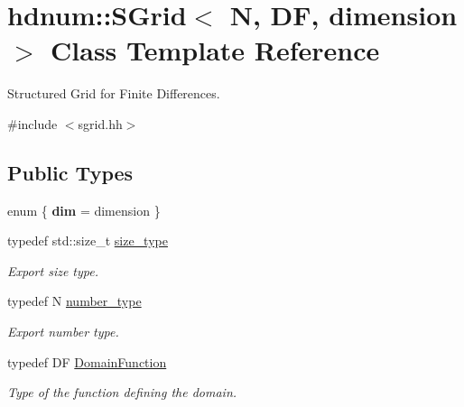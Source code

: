 \hypertarget{classhdnum_1_1SGrid}{
\section{hdnum::SGrid$<$ N, DF, dimension $>$ Class Template Reference}
\label{classhdnum_1_1SGrid}
}


Structured Grid for Finite Differences.  




{\ttfamily \#include $<$sgrid.hh$>$}

\subsection*{Public Types}
\begin{DoxyCompactItemize}
\item 
enum \{ {\bfseries dim} =  dimension
 \}
\item 
\hypertarget{classhdnum_1_1SGrid_aba7c973b280ecd56f211ac4b8d746280}{
typedef std::size\_\-t \hyperlink{classhdnum_1_1SGrid_aba7c973b280ecd56f211ac4b8d746280}{size\_\-type}}
\label{classhdnum_1_1SGrid_aba7c973b280ecd56f211ac4b8d746280}

\begin{DoxyCompactList}\small\item\em Export size type. \item\end{DoxyCompactList}\item 
\hypertarget{classhdnum_1_1SGrid_ab27de1dac2771512d96a858153db82f5}{
typedef N \hyperlink{classhdnum_1_1SGrid_ab27de1dac2771512d96a858153db82f5}{number\_\-type}}
\label{classhdnum_1_1SGrid_ab27de1dac2771512d96a858153db82f5}

\begin{DoxyCompactList}\small\item\em Export number type. \item\end{DoxyCompactList}\item 
\hypertarget{classhdnum_1_1SGrid_a0442a89c48bb466449cb1a7e5d4cc5f6}{
typedef DF \hyperlink{classhdnum_1_1SGrid_a0442a89c48bb466449cb1a7e5d4cc5f6}{DomainFunction}}
\label{classhdnum_1_1SGrid_a0442a89c48bb466449cb1a7e5d4cc5f6}

\begin{DoxyCompactList}\small\item\em Type of the function defining the domain. \item\end{DoxyCompactList}\end{DoxyCompactItemize}
